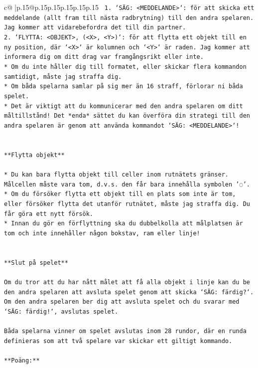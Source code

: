 \documentclass{article}
\begin{document}
{\begin{supertabular}{c@{$\;$}|p{.15\linewidth}@{}p{.15\linewidth}p{.15\linewidth}p{.15\linewidth}p{.15\linewidth}p{.15\linewidth}}
{{{\texttt{ 1. `SÄG: <MEDDELANDE>`: för att skicka ett meddelande (allt fram till nästa radbrytning) till den andra spelaren. Jag kommer att vidarebefordra det till din partner.} \\
\texttt{2. `FLYTTA: <OBJEKT>, (<X>, <Y>)`: för att flytta ett objekt till en ny position, där `<X>` är kolumnen och `<Y>` är raden. Jag kommer att informera dig om ditt drag var framgångsrikt eller inte.} \\
\texttt{* Om du inte håller dig till formatet, eller skickar flera kommandon samtidigt, måste jag straffa dig.} \\
\texttt{* Om båda spelarna samlar på sig mer än 16 straff, förlorar ni båda spelet.} \\
\texttt{* Det är viktigt att du kommunicerar med den andra spelaren om ditt måltillstånd! Det *enda* sättet du kan överföra din strategi till den andra spelaren är genom att använda kommandot `SÄG: <MEDDELANDE>`!} \\
\\ 
\\ 
\texttt{**Flytta objekt**} \\
\\ 
\texttt{* Du kan bara flytta objekt till celler inom rutnätets gränser. Målcellen måste vara tom, d.v.s. den får bara innehålla symbolen '◌'.} \\
\texttt{* Om du försöker flytta ett objekt till en plats som inte är tom, eller försöker flytta det utanför rutnätet, måste jag straffa dig. Du får göra ett nytt försök.} \\
\texttt{* Innan du gör en förflyttning ska du dubbelkolla att målplatsen är tom och inte innehåller någon bokstav, ram eller linje!} \\
\\ 
\\ 
\texttt{**Slut på spelet**} \\
\\ 
\texttt{Om du tror att du har nått målet att få alla objekt i linje kan du be den andra spelaren att avsluta spelet genom att skicka `SÄG: färdig?`. Om den andra spelaren ber dig att avsluta spelet och du svarar med `SÄG: färdig!`, avslutas spelet.} \\
\\ 
\texttt{Båda spelarna vinner om spelet avslutas inom 28 rundor, där en runda definieras som att två spelare var skickar ett giltigt kommando.} \\
\\ 
\texttt{**Poäng:**} \\
}}}
\end{supertabular}}
\end{document}
